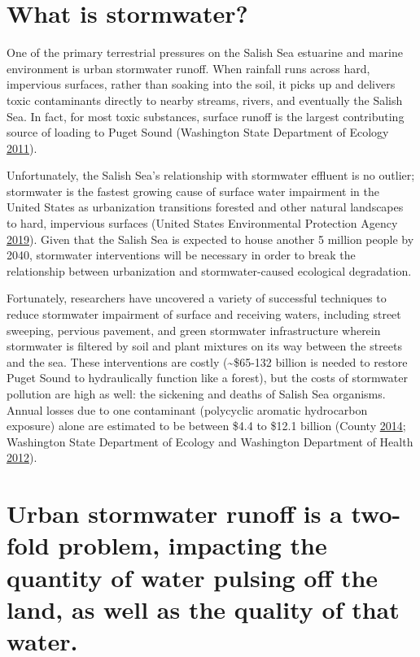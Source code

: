 \documentclass[
]{report}
\begin{document}
\hypertarget{what-is-stormwater}{%
\section{What is stormwater?}\label{what-is-stormwater}}

One of the primary terrestrial pressures on the Salish Sea estuarine and marine environment is urban stormwater runoff. When rainfall runs across hard, impervious surfaces, rather than soaking into the soil, it picks up and delivers toxic contaminants directly to nearby streams, rivers, and eventually the Salish Sea. In fact, for most toxic substances, surface runoff is the largest contributing source of loading to Puget Sound (Washington State Department of Ecology \protect\hyperlink{ref-WashingtonStateDepartmentofEcology2011}{2011}).

Unfortunately, the Salish Sea's relationship with stormwater effluent is no outlier; stormwater is the fastest growing cause of surface water impairment in the United States as urbanization transitions forested and other natural landscapes to hard, impervious surfaces (United States Environmental Protection Agency \protect\hyperlink{ref-USEPA2019}{2019}). Given that the Salish Sea is expected to house another 5 million people by 2040, stormwater interventions will be necessary in order to break the relationship between urbanization and stormwater-caused ecological degradation.

Fortunately, researchers have uncovered a variety of successful techniques to reduce stormwater impairment of surface and receiving waters, including street sweeping, pervious pavement, and green stormwater infrastructure wherein stormwater is filtered by soil and plant mixtures on its way between the streets and the sea. These interventions are costly (\textasciitilde\$65-132 billion is needed to restore Puget Sound to hydraulically function like a forest), but the costs of stormwater pollution are high as well: the sickening and deaths of Salish Sea organisms. Annual losses due to one contaminant (polycyclic aromatic hydrocarbon exposure) alone are estimated to be between \$4.4 to \$12.1 billion (County \protect\hyperlink{ref-County2014}{2014}; Washington State Department of Ecology and Washington Department of Health \protect\hyperlink{ref-WashingtonStateDepartmentofEcologyandWashingtonDepartmentofHealth2012}{2012}).

\hypertarget{urban-stormwater-runoff-is-a-two-fold-problem-impacting-the-quantity-of-water-pulsing-off-the-land-as-well-as-the-quality-of-that-water.}{%
\section{Urban stormwater runoff is a two-fold problem, impacting the quantity of water pulsing off the land, as well as the quality of that water.}\label{urban-stormwater-runoff-is-a-two-fold-problem-impacting-the-quantity-of-water-pulsing-off-the-land-as-well-as-the-quality-of-that-water.}}
\end{document}
